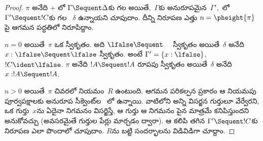 \documentclass[../../../include/open-logic-section]{subfiles}
\begin{document}
\begin{proof}
  $\pi$ అనేది  + \Cut{}లో $\Gamma \Sequent \Delta$కు గల  అయితే,~$\Gamma$కు అనురూపమైన~$\Gamma'$,~లో~$\Gamma' \Sequent !C$కు గల ~$\delta$ ఉన్నాయని చూపుదాం. దీన్ని నిరూపణ ఎత్తు $n = \pheight{\pi}$పై ఆగమన పద్ధతిలో నిరూపిద్దాం.

  $n = 0$ అయితే~$\pi$ ఒక స్వీకృతం. అది $\lfalse \Sequent
  \quad$ స్వీకృతం అయితే~$\delta$ అనేది $x:\lfalse \Sequent \lfalse$ స్వీకృతం. అంటే $\Gamma' = \{x:\lfalse\}$, $!C \ident \lfalse$. $\pi$ అనేది $!A \Sequent !A$ రూపపు స్వీకృతం అయితే~$\delta$ అనేది $x: !A \Sequent !A$.

  $n>0$ అయితే~$\pi$ చివరలో నియమం~$R$ ఉంటుంది. ఆగమన పరికల్పన ప్రకారం ఆ నియమపు పూర్వపక్షాలకు అనురూప సీక్వెంట్‌ల ~లో ఉన్నాయి. వాటిలోని అన్ని విసర్జన గుర్తులూ వేర్వేరని, ఒక గుర్తు~$x$ను ఏదైనా నిగమనం విసర్జిస్తే, ఆ గుర్తు ఆ నిగమనం పైన మాత్రమే కనిపిస్తుందని అనుకోవచ్చు (అవసరమైతే గుర్తుల పేర్లు మార్చడం ద్వారా). ఆ  కలిపి తగిన $\Gamma' \Sequent !C$కు నిరూపణ ఎలా పొందాలో చూపుదాం. $R$ను బట్టి సందర్భాలను విడివిడిగా చూద్దాం.


\end{proof}
\end{document}
